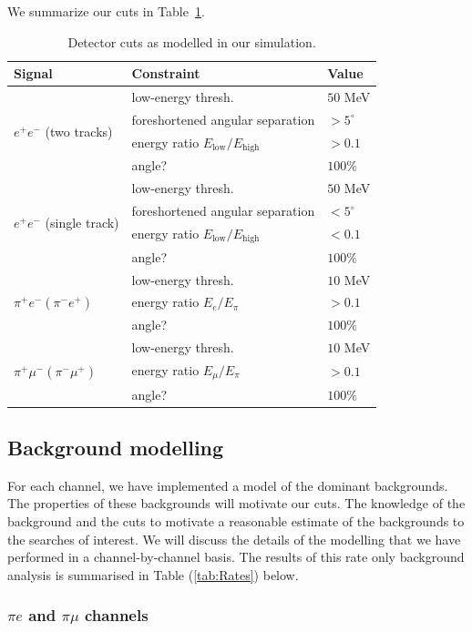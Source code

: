 \documentclass[11pt, a4paper]{article}
\newcommand{\reftab}[1]{Table~\ref{#1}}
\begin{document}
We summarize our cuts in \reftab{tab:cuts}.
%
\begin{table}[t]
\centering
\begin{tabular}{ l | l | l}
Signal & Constraint & Value \\
\hline\hline
 \multirow{4}{*}{$e^+ e^-$ (two tracks)} & low-energy thresh. & $50$ MeV\\
 \cline{2-3}
 & foreshortened angular separation & $>5^\circ$ \\
 \cline{2-3}
 & energy ratio $E_\text{low}/E_\text{high}$ & $>0.1$\\
 \cline{2-3}
 & angle? & $100\%$\\
\cline{1-3}
 \multirow{4}{*}{$e^+ e^-$ (single track)} & low-energy thresh. & $50$ MeV\\
 \cline{2-3}
 & foreshortened angular separation & $<5^\circ$ \\
 \cline{2-3}
 & energy ratio $E_\text{low}/E_\text{high}$ & $<0.1$\\
 \cline{2-3}
 & angle? & $100\%$\\
\cline{1-3}
 \multirow{3}{*}{$\pi^+e^-(\pi^-e^+)$} & low-energy thresh. & $10$ MeV\\
 \cline{2-3}
 & energy ratio $E_e/E_\pi$ & $>0.1$\\
 \cline{2-3}
 & angle? & $100\%$\\
\cline{1-3}
 \multirow{3}{*}{$\pi^+\mu^-(\pi^-\mu^+)$} & low-energy thresh. & $10$ MeV\\
\cline{2-3}
 & energy ratio $E_\mu/E_\pi$ & $>0.1$\\
\cline{2-3}
 & angle? & $100\%$\\
\end{tabular}
\caption{\label{tab:cuts}Detector cuts as modelled in our simulation.}
\end{table}
\newpage
\newpage
\subsection{Background modelling}
For each channel, we have implemented a model of the dominant backgrounds. The
properties of these backgrounds will motivate our cuts. The knowledge of the
background and the cuts to motivate a reasonable estimate of the backgrounds to the searches of interest.  We will discuss the details of the modelling that we have performed in a channel-by-channel basis. The results of this rate only background analysis is summarised in Table (\ref{tab:Rates}) below.

\subsubsection{$\pi e$ and $\pi \mu$ channels}
\end{document}
